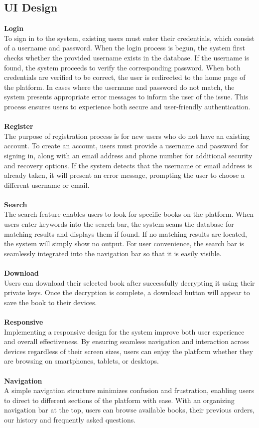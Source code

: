 \documentclass[12pt]{article}
\begin{document}
\pagebreak
\subsection{UI Design}
\textbf{Login}\\
To sign in to the system, existing users must enter their credentials, which consist of a username and password. When the login process is begun, the system first checks whether the provided username exists in the database. If the username is found, the system proceeds to verify the corresponding password. When both credentials are verified to be correct, the user is redirected to the home page of the platform. In cases where the username and password do not match, the system presents appropriate error messages to inform the user of the issue. This process ensures users to experience both secure and user-friendly authentication.\\\\

\textbf{Register}\\
The purpose of registration process is for new users who do not have an existing account. To create an account, users must provide a username and password for signing in, along with an email address and phone number for additional security and recovery options. If the system detects that the username or email address is already taken, it will present an error message, prompting the user to choose a different username or email.\\\\
\textbf{Search}\\
The search feature enables users to look for specific books on the platform. When users enter keywords into the search bar, the system scans the database for matching results and displays them if found. If no matching results are located, the system will simply show no output. For user convenience, the search bar is seamlessly integrated into the navigation bar so that it is easily visible.\\\\
\textbf{Download}\\
Users can download their selected book after successfully decrypting it using their private keys. Once the decryption is complete, a download button will appear to  save the book to their devices.\\\\
\textbf{Responsive}\\
Implementing a responsive design for the system improve both user experience and overall effectiveness. By ensuring seamless navigation and interaction across devices regardless of their screen sizes, users can enjoy the platform whether they are browsing on smartphones, tablets, or desktops.\\\\
\textbf{Navigation}\\
A simple navigation structure minimizes confusion and frustration, enabling users to direct to different sections of the platform with ease. With an organizing navigation bar at the top, users can browse available books, their previous orders, our history and frequently asked questions.
\end{document}
